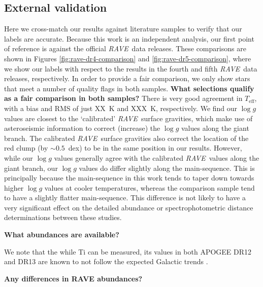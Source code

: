 \documentclass[preprint,trackchanges]{aastex}
\newcommand{\acronym}[1]{{\small{#1}}}
\newcommand{\project}[1]{\textsl{#1}}
\newcommand{\rave}{\project{\acronym{RAVE}}}
\newcommand{\stub}[1]{\textbf{#1}}
\newcommand{\teff}{T_{\mathrm{eff}}}
\newcommand{\logg}{\log g}
\begin{document}


\subsection{External validation}
\label{sec:external-validation}

Here we cross-match our results against literature samples to verify that
our labels are accurate.  Because this work is an independent analysis, our
first point of reference is against the official \rave\ data releases.  These
comparisons are shown in Figures \ref{fig:rave-dr4-comparison} and 
\ref{fig:rave-dr5-comparison}, where we show our labels with respect to the
results in the fourth and fifth \rave\ data releases, respectively.  In order
to provide a fair comparison, we only show stars that meet a number of quality
flags in both samples. 
\stub{What selections qualify as a fair comparison in both samples?}
There is very good agreement in $\teff$, with a bias
and RMS of just XX~K and XXX~K, respectively.  We find our $\logg$ values are
closest to the `calibrated' \rave\ surface gravities, which make use of 
asteroseismic information to correct (increase) the $\logg$ values along the
giant branch.  The calibrated \rave\ surface gravities also correct the 
location of the red clump (by $\sim0.5$~dex) to be in the same position in our
results.  However, while our $\logg$ values generally agree with the calibrated
\rave\ values along the giant branch, our $\logg$ values do differ slightly 
along the main-sequence.  This is principally because the main-sequence in 
this work tends to taper down towards higher $\logg$ values at cooler 
temperatures, whereas the comparison sample tend to have a slightly flatter
main-sequence.  This difference is not likely to have a very significant 
effect on the detailed abundance or spectrophotometric distance determinations
between these studies.

\stub{What abundances are available?}

We note that the while Ti can be measured, its values in both 
APOGEE DR12 and DR13 are known to not follow the expected Galactic trends \citep{Holtzman_2015, Hawkins_2016}.

\stub{Any differences in RAVE abundances?}

\end{document}

